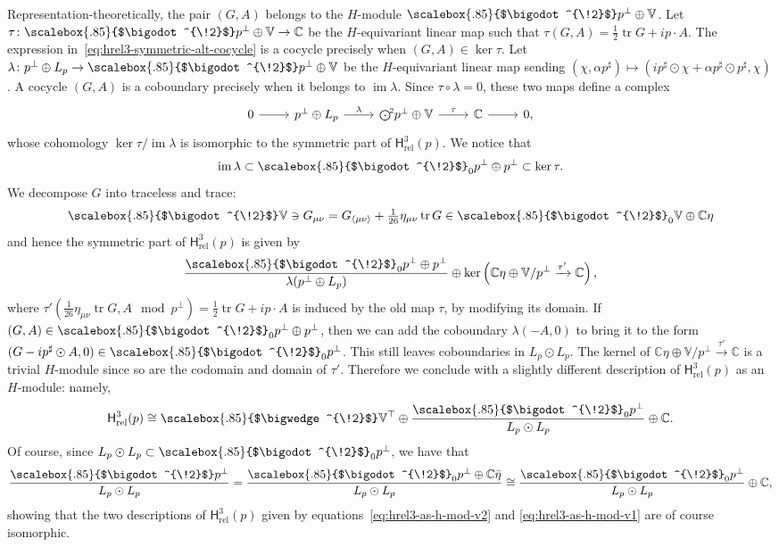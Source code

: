 \documentclass[11pt,reqno,a4paper,final]{amsart}
\newcommand\ext[1]{\scalebox{.85}{$\bigwedge^{\!#1}$}}
\newcommand\sym[1]{\scalebox{.85}{$\bigodot^{\!#1}$}}
\theoremstyle{plain}
\theoremstyle{definition}
\newcommand{\Hrel}{\mathsf{H}_{\mathrm{rel}}}
\newcommand{\tr}{\operatorname{tr}}
\newcommand{\VV}{\mathbb{V}}
\newcommand{\CC}{\mathbb{C}}
\newcommand{\1}{\mathbb{1}}
\newcommand{\im}{\operatorname{im}}
\numberwithin{equation}{section}
\begin{document}
Representation-theoretically, the pair $(G, A)$ belongs
to the $H$-module $\sym{2}p^\perp \oplus \VV$.  Let $\tau \colon
\sym{2}p^\perp \oplus \VV \to \CC$ be the $H$-equivariant linear map
such that $\tau(G,A) = \tfrac12 \tr G + i p \cdot A$.  The expression
in~\eqref{eq:hrel3-symmetric-alt-cocycle} is a cocycle precisely when
$(G,A) \in \ker \tau$.  Let $\lambda \colon p^\perp \oplus L_p \to \sym{2}
p^\perp \oplus \VV$ be the $H$-equivariant linear map sending
$(\chi,\alpha p^\sharp) \mapsto (i p^\sharp \odot\chi + \alpha
p^\sharp \odot p^\sharp , \chi)$.  A cocycle $(G,A)$  is a coboundary
precisely when it belongs to $\im \lambda$.  Since $\tau \circ \lambda
= 0$, these two maps define a complex
\begin{equation}
  \begin{tikzcd}
    0 \arrow[r] & p^\perp \oplus L_p \arrow[r,"\lambda"] & \sym{2} p^\perp \oplus
    \VV \arrow[r, "\tau"] & \CC \arrow[r] & 0,
  \end{tikzcd}
\end{equation}
whose cohomology $\ker \tau/\im \lambda$ is isomorphic to the
symmetric part of $\Hrel^3(p)$.  We notice that
\begin{equation}
  \im \lambda \subset \sym{2}_0 p^\perp \oplus p^\perp \subset \ker \tau.
\end{equation}
We decompose $G$ into traceless and trace:
\begin{equation}
\sym{2}\VV \ni  G_{\mu\nu} = G_{\left<\mu\nu\right>} + \tfrac1{26}
\eta_{\mu\nu} \tr G \in \sym{2}_0 \VV \oplus \CC \eta
\end{equation}
and hence the symmetric part of $\Hrel^3(p)$ is given by
\begin{equation}
  \dfrac{\sym{2}_0 p^\perp \oplus p^\perp}{\lambda(p^\perp \oplus L_p)} \oplus
  \ker\left( \CC\eta \oplus \VV/p^\perp \xrightarrow{\tau'} \CC \right),
\end{equation}
where $\tau'(\tfrac1{26} \eta_{\mu\nu} \tr G, A \mod p^\perp) = \tfrac12 \tr
G + i p \cdot A$ is induced by the old map $\tau$, by modifying its
domain.  If $(G,A) \in \sym{2}_0 p^\perp \oplus p^\perp$, then we can
add the coboundary $\lambda(-A,0)$ to bring it to the form
$(G - i p^\sharp \odot A, 0) \in \sym{2}_0p^\perp$.  This still leaves
coboundaries in $L_p \odot L_p$.  The kernel of $\CC\eta \oplus
\VV/p^\perp \xrightarrow{\tau'} \CC$ is a trivial $H$-module since so
are the codomain and domain of $\tau'$.  Therefore we conclude with a
slightly different description of $\Hrel^3(p)$ as an $H$-module:
namely,
\begin{equation}
  \label{eq:hrel3-as-h-mod-v2}
  \Hrel^3(p) \cong \ext{2}\VV^\top \oplus \dfrac{\sym{2}_0
    p^\perp}{L_p \odot L_p} \oplus \CC.
\end{equation}
Of course, since $L_p \odot L_p \subset \sym{2}_0 p^\perp$, we have
that
\begin{equation}
  \dfrac{\sym{2} p^\perp}{L_p \odot L_p} =   \dfrac{\sym{2}_0 p^\perp
    \oplus \CC \bar\eta}{L_p \odot L_p}\cong  \dfrac{\sym{2}_0
    p^\perp}{L_p \odot L_p} \oplus \CC,
\end{equation}
showing that the two descriptions of $\Hrel^3(p)$ given by
equations~\eqref{eq:hrel3-as-h-mod-v2} and
\eqref{eq:hrel3-as-h-mod-v1} are of course isomorphic.
\end{document}
